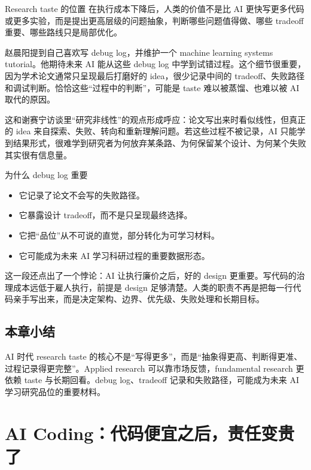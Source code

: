 \documentclass[a4paper]{article}
\begin{document}
\begin{importantbox}{Research taste 的位置}
在执行成本下降后，人类的价值不是比 AI 更快写更多代码或更多实验，而是提出更高层级的问题抽象，判断哪些问题值得做、哪些 tradeoff 重要、哪些路线只是局部优化。
\end{importantbox}

赵晨阳提到自己喜欢写 debug log，并维护一个 machine learning systems tutorial。他期待未来 AI 能从这些 debug log 中学到试错过程。这个细节很重要，因为学术论文通常只呈现最后打磨好的 idea，很少记录中间的 tradeoff、失败路径和调试判断。恰恰这些“过程中的判断”，可能是 taste 难以被蒸馏、也难以被 AI 取代的原因。

这和谢赛宁访谈里“研究非线性”的观点形成呼应：论文写出来时看似线性，但真正的 idea 来自探索、失败、转向和重新理解问题。若这些过程不被记录，AI 只能学到结果形式，很难学到研究者为何放弃某条路、为何保留某个设计、为何某个失败其实很有信息量。

\begin{knowledgebox}{为什么 debug log 重要}
\begin{itemize}
  \item 它记录了论文不会写的失败路径。
  \item 它暴露设计 tradeoff，而不是只呈现最终选择。
  \item 它把“品位”从不可说的直觉，部分转化为可学习材料。
  \item 它可能成为未来 AI 学习科研过程的重要数据形态。
\end{itemize}
\end{knowledgebox}

这一段还点出了一个悖论：AI 让执行廉价之后，好的 design 更重要。写代码的治理成本远低于雇人执行，前提是 design 足够清楚。人类的职责不再是把每一行代码亲手写出来，而是决定架构、边界、优先级、失败处理和长期目标。

\subsection{本章小结}

AI 时代 research taste 的核心不是“写得更多”，而是“抽象得更高、判断得更准、过程记录得更完整”。Applied research 可以靠市场反馈，fundamental research 更依赖 taste 与长期回看。debug log、tradeoff 记录和失败路径，可能成为未来 AI 学习研究品位的重要材料。

\section{AI Coding：代码便宜之后，责任变贵了}
\end{document}
